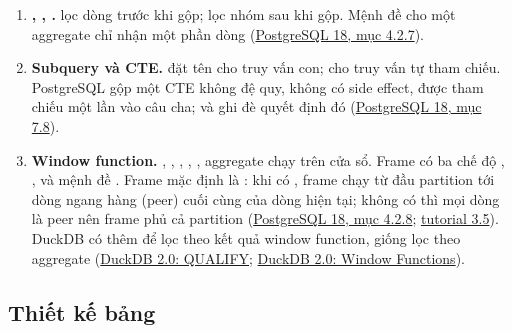 \begin{enumerate}
  \item \textbf{, , .}  lọc dòng trước khi gộp;  lọc nhóm sau khi gộp. Mệnh đề  cho một aggregate chỉ nhận một phần dòng (\href{https://www.postgresql.org/docs/current/sql-expressions.html}{PostgreSQL 18, mục 4.2.7}).
  \item \textbf{Subquery và CTE.}  đặt tên cho truy vấn con;  cho truy vấn tự tham chiếu. PostgreSQL gộp một CTE không đệ quy, không có side effect, được tham chiếu một lần vào câu cha;  và  ghi đè quyết định đó (\href{https://www.postgresql.org/docs/current/queries-with.html}{PostgreSQL 18, mục 7.8}).
  \item \textbf{Window function.} , , , , , aggregate chạy trên cửa sổ. Frame có ba chế độ , ,  và mệnh đề . Frame mặc định là : khi có , frame chạy từ đầu partition tới dòng ngang hàng (peer) cuối cùng của dòng hiện tại; không có  thì mọi dòng là peer nên frame phủ cả partition (\href{https://www.postgresql.org/docs/current/sql-expressions.html}{PostgreSQL 18, mục 4.2.8}; \href{https://www.postgresql.org/docs/current/tutorial-window.html}{tutorial 3.5}). DuckDB có thêm  để lọc theo kết quả window function, giống  lọc theo aggregate (\href{https://duckdb.org/docs/2.0/sql/query_syntax/qualify}{DuckDB 2.0: QUALIFY}; \href{https://duckdb.org/docs/2.0/sql/functions/window_functions}{DuckDB 2.0: Window Functions}).
\end{enumerate}

\subsection{Thiết kế bảng}

